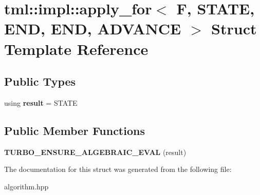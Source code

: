 \hypertarget{structtml_1_1impl_1_1apply__for_3_01F_00_01STATE_00_01END_00_01END_00_01ADVANCE_01_4}{\section{tml\+:\+:impl\+:\+:apply\+\_\+for$<$ F, S\+T\+A\+T\+E, E\+N\+D, E\+N\+D, A\+D\+V\+A\+N\+C\+E $>$ Struct Template Reference}
\label{structtml_1_1impl_1_1apply__for_3_01F_00_01STATE_00_01END_00_01END_00_01ADVANCE_01_4}
}
\subsection*{Public Types}
\begin{DoxyCompactItemize}
\item 
\hypertarget{structtml_1_1impl_1_1apply__for_3_01F_00_01STATE_00_01END_00_01END_00_01ADVANCE_01_4_ad0cb095a5a5357d2c5f35b4f50fe7285}{using {\bfseries result} = S\+T\+A\+T\+E}\label{structtml_1_1impl_1_1apply__for_3_01F_00_01STATE_00_01END_00_01END_00_01ADVANCE_01_4_ad0cb095a5a5357d2c5f35b4f50fe7285}

\end{DoxyCompactItemize}
\subsection*{Public Member Functions}
\begin{DoxyCompactItemize}
\item 
\hypertarget{structtml_1_1impl_1_1apply__for_3_01F_00_01STATE_00_01END_00_01END_00_01ADVANCE_01_4_a545eccc61012f6b855d522f3566f1d3c}{{\bfseries T\+U\+R\+B\+O\+\_\+\+E\+N\+S\+U\+R\+E\+\_\+\+A\+L\+G\+E\+B\+R\+A\+I\+C\+\_\+\+E\+V\+A\+L} (result)}\label{structtml_1_1impl_1_1apply__for_3_01F_00_01STATE_00_01END_00_01END_00_01ADVANCE_01_4_a545eccc61012f6b855d522f3566f1d3c}

\end{DoxyCompactItemize}


The documentation for this struct was generated from the following file\+:\begin{DoxyCompactItemize}
\item 
algorithm.\+hpp\end{DoxyCompactItemize}
